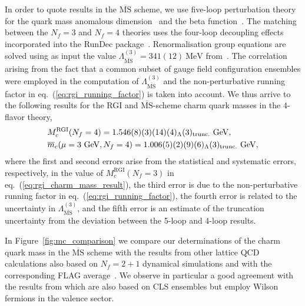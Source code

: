 In order to quote results in the $\overline{\textrm{MS}}$ scheme, we use five-loop perturbation theory for the quark
mass anomalous dimension~\cite{Baikov:2014qja,Luthe:2016xec,Baikov:2017ujl} and the beta function~\cite{Baikov:2016tgj,Herzog:2017ohr,Luthe:2017ttc}.
The matching between the $N_f=3$ and $N_f=4$ theories uses the four-loop decoupling effects~\cite{Liu:2015fxa}
incorporated into the RunDec package~\cite{Chetyrkin:2000yt,Schmidt:2012az,Herren:2017osy}. Renormalisation group equations are solved using as input the value 
$\Lambda^{(3)}_{\overline{\mathrm{MS}}} = 341(12)\ \mathrm{MeV}$ from~\cite{Bruno:2017gxd}. The correlation arising from the fact that a common subset of gauge field configuration ensembles were employed in the computation of $\Lambda^{(3)}_{\overline{\mathrm{MS}}}$ and the non-perturbative running factor in eq.~(\ref{eq:rgi_running_factor}) is taken into account. We thus arrive to the following results for the RGI and $\overline{\textrm{MS}}$-scheme charm quark masses in the 4-flavor theory,
\begin{align}
  &M_c^{\mathrm{RGI}}(N_f=4)=1.546(8)(3)(14)(4)_\Lambda(3)_{\rm trunc.} \ \mathrm{GeV},\\
  &\overline{m}_c(\mu=3\ \mathrm{GeV}, N_f=4)=1.006(5)(2)(9)(6)_\Lambda(3)_{\rm trunc.} \ \mathrm{GeV},
\end{align}
where the first and second errors arise from the statistical and systematic errors, respectively, in the value of $M_c^{\mathrm{RGI}}(N_f=3)$ in eq.~(\ref{eq:rgi_charm_mass_result}), the third error is due to the non-perturbative running factor in eq.~(\ref{eq:rgi_running_factor}), the fourth error is related to the uncertainty in $\Lambda^{(3)}_{\overline{\mathrm{MS}}}$, and the fifth error is an estimate of the truncation uncertainty from the deviation between the 5-loop and 4-loop results. 

In Figure~\ref{fig:mc_comparison} we compare our determinations of the charm quark mass in the $\overline{\textrm{MS}}$ scheme with the results from other lattice QCD calculations also based on $N_f=2+1$ dynamical simulations and with the corresponding FLAG average~\cite{FlavourLatticeAveragingGroupFLAG:2021npn}. We observe in particular a good agreement with the results from \cite{Heitger:2021apz} which are also based on CLS ensembles but employ Wilson fermions in the valence sector.

